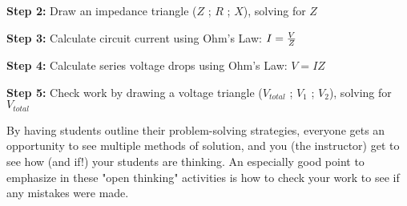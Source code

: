 {\bf Step 2:} Draw an impedance triangle ($Z$ ; $R$ ; $X$), solving for $Z$

{\bf Step 3:} Calculate circuit current using Ohm's Law: $I = {V \over Z}$

{\bf Step 4:} Calculate series voltage drops using Ohm's Law: $V = {I Z}$

{\bf Step 5:} Check work by drawing a voltage triangle ($V_{total}$ ; $V_1$ ; $V_2$), solving for $V_{total}$

\vskip 10pt

By having students outline their problem-solving strategies, everyone gets an opportunity to see multiple methods of solution, and you (the instructor) get to see how (and if!) your students are thinking.  An especially good point to emphasize in these "open thinking" activities is how to check your work to see if any mistakes were made.





